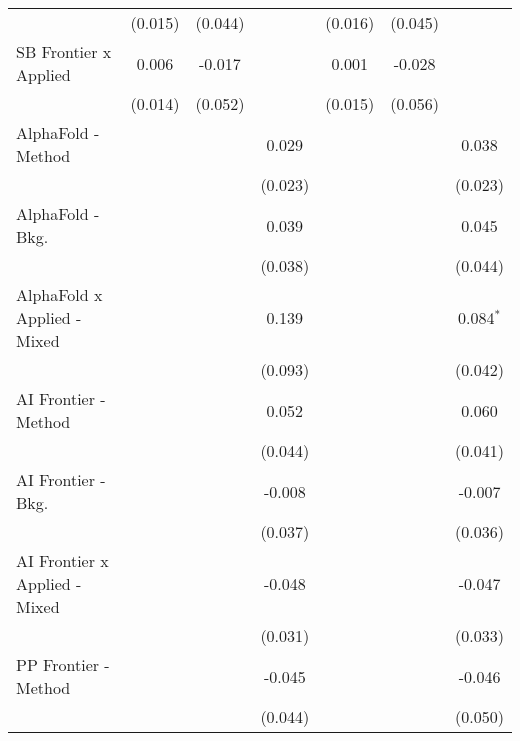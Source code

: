 \begin{tabular}{lcccccc}
                                  & (0.015)       & (0.044) &         & (0.016)       & (0.045)       &   \\   
   SB Frontier x Applied          & 0.006         & -0.017  &         & 0.001         & -0.028        &   \\   
                                  & (0.014)       & (0.052) &         & (0.015)       & (0.056)       &   \\   
   AlphaFold - Method             &               &         & 0.029   &               &               & 0.038\\   
                                  &               &         & (0.023) &               &               & (0.023)\\   
   AlphaFold - Bkg.               &               &         & 0.039   &               &               & 0.045\\   
                                  &               &         & (0.038) &               &               & (0.044)\\   
   AlphaFold x Applied - Mixed    &               &         & 0.139   &               &               & 0.084$^{*}$\\   
                                  &               &         & (0.093) &               &               & (0.042)\\   
   AI Frontier - Method           &               &         & 0.052   &               &               & 0.060\\   
                                  &               &         & (0.044) &               &               & (0.041)\\   
   AI Frontier - Bkg.             &               &         & -0.008  &               &               & -0.007\\   
                                  &               &         & (0.037) &               &               & (0.036)\\   
   AI Frontier x Applied - Mixed  &               &         & -0.048  &               &               & -0.047\\   
                                  &               &         & (0.031) &               &               & (0.033)\\   
   PP Frontier - Method           &               &         & -0.045  &               &               & -0.046\\   
                                  &               &         & (0.044) &               &               & (0.050)\\   

\end{tabular}
